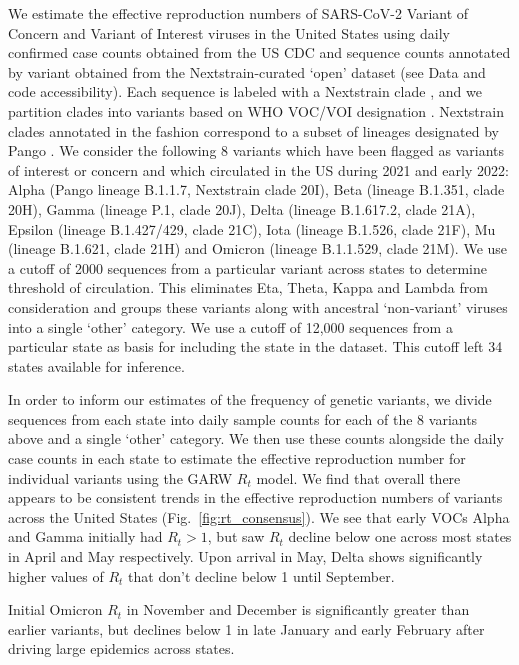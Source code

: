 \documentclass[11pt,oneside,letterpaper]{article}
\begin{document}
We estimate the effective reproduction numbers of SARS-CoV-2 Variant of Concern and Variant of Interest viruses in the United States using daily confirmed case counts obtained from the US CDC and sequence counts annotated by variant obtained from the Nextstrain-curated `open' dataset \cite{Hadfield2018} (see Data and code accessibility).
Each sequence is labeled with a Nextstrain clade \cite{Hadfield2018}, and we partition clades into variants based on WHO VOC/VOI designation \cite{Konings2021}.
Nextstrain clades annotated in the fashion correspond to a subset of lineages designated by Pango \cite{Rambaut2020}.
We consider the following 8 variants which have been flagged as variants of interest or concern and which circulated in the US during 2021 and early 2022: Alpha (Pango lineage B.1.1.7, Nextstrain clade 20I), Beta (lineage B.1.351, clade 20H), Gamma (lineage P.1, clade 20J), Delta (lineage B.1.617.2, clade 21A), Epsilon (lineage B.1.427/429, clade 21C), Iota (lineage B.1.526, clade 21F), Mu (lineage B.1.621, clade 21H) and Omicron (lineage B.1.1.529, clade 21M).
We use a cutoff of 2000 sequences from a particular variant across states to determine threshold of circulation.
This eliminates Eta, Theta, Kappa and Lambda from consideration and groups these variants along with ancestral `non-variant' viruses into a single `other' category.
We use a cutoff of 12,000 sequences from a particular state as basis for including the state in the dataset.
This cutoff left 34 states available for inference.

In order to inform our estimates of the frequency of genetic variants, we divide sequences from each state into daily sample counts for each of the 8 variants above and a single `other' category.
We then use these counts alongside the daily case counts in each state to estimate the effective reproduction number for individual variants using the GARW $R_{t}$ model.
We find that overall there appears to be consistent trends in the effective reproduction numbers of variants across the United States (Fig.\ \ref{fig:rt_consensus}).
We see that early VOCs Alpha and Gamma initially had $R_t>1$, but saw $R_t$ decline below one across most states in April and May respectively.
Upon arrival in May, Delta shows significantly higher values of $R_t$ that don't decline below 1 until September.

Initial Omicron $R_t$ in November and December is significantly greater than earlier variants, but declines below 1 in late January and early February after driving large epidemics across states.
\end{document}
